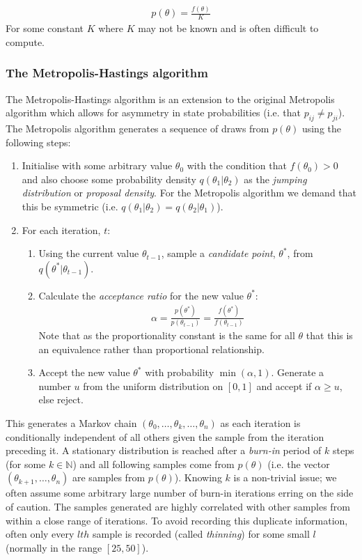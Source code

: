 \documentclass[11pt]{article} %
\begin{document}
\begin{align}
p(\theta) = \frac{f(\theta)}{K} 
\end{align}
For some constant $K$ where $K$ may not be known and is often difficult to compute.

\subsubsection{The Metropolis-Hastings algorithm}
The Metropolis-Hastings algorithm \cite{HastingsMonteCarloSampling} is an extension to the original Metropolis algorithm which allows for asymmetry in state probabilities (i.e. that $p_{ij} \neq p_{ji}$). The Metropolis algorithm \cite{MetropolisMonteCarloMethod1949} \cite{MetropolisEquationStateCalculations1953} generates a sequence of draws from $p(\theta)$ using the following steps:

\begin{enumerate}
 \item Initialise with some arbitrary value $\theta_0$ with the condition that $f(\theta_0) > 0$ and also choose some probability density $q(\theta_1|\theta_2)$ as the \emph{jumping distribution} or \emph{proposal density}. For the Metropolis algorithm we demand that this be symmetric (i.e. $q(\theta_1 | \theta_2) = q(\theta_2 | \theta_1)$).
 \item For each iteration, $t$:
 \begin{enumerate}
   \item Using the current value $\theta_{t-1}$, sample a \emph{candidate point}, $\theta^*$, from  $q(\theta^* | \theta_{t-1})$.
   \item Calculate the \emph{acceptance ratio} for the new value $\theta^*$:
    \begin{align}
    \alpha = \frac{p(\theta^*)}{p(\theta_{t-1})} = \frac{f(\theta^*)}{f(\theta_{t-1})}
    \end{align}
    Note that as the proportionality constant is the same for all $\theta$ that this is an equivalence rather than proportional relationship.
    \item Accept the new value $\theta^*$ with probability $\min(\alpha, 1)$. Generate a number $u$ from the uniform distribution on $[0,1]$ and accept if $\alpha \geq u$, else reject.
  \end{enumerate}
\end{enumerate}
This generates a Markov chain $(\theta_0,\ldots,\theta_k,\ldots, \theta_n)$ as each iteration is conditionally independent of all others given the sample from the iteration preceding it. A stationary distribution is reached after a \emph{burn-in} period of $k$ steps (for some $k \in \mathbb{N}$) and all following samples come from $p(\theta)$ (i.e. the vector $(\theta_{k+1},\ldots,\theta_n)$ are samples from $p(\theta)$). Knowing $k$ is a non-trivial issue; we often assume some arbitrary large number of burn-in iterations erring on the side of caution. The samples generated are highly correlated with other samples from within a close range of iterations. To avoid recording this duplicate information, often only every $lth$ sample is recorded (called \emph{thinning}) for some small $l$ (normally in the range $[25, 50]$).
\end{document}
